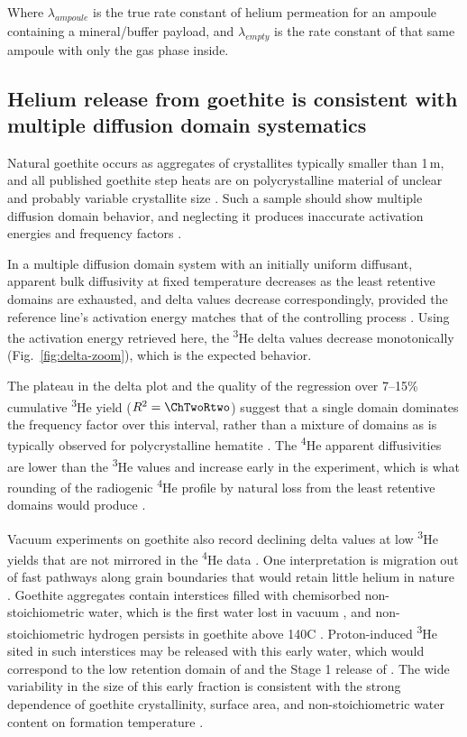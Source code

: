 Where $\lambda_{ampoule}$ is the true rate constant of helium permeation for an ampoule containing a mineral/buffer payload, and $\lambda_{empty}$ is the rate constant of that same ampoule with only the gas phase inside.

\subsection{Helium release from goethite is consistent with multiple diffusion domain systematics}\label{sec:discussion-mdd}

Natural goethite occurs as aggregates of crystallites typically smaller than 1\,\textmu m, and all published goethite step heats are on polycrystalline material of unclear and probably variable crystallite size \citep{monteiro2017,farley2024}. Such a sample should show multiple diffusion domain behavior, and neglecting it produces inaccurate activation energies and frequency factors \citep{farley2018}.

In a multiple diffusion domain system with an initially uniform diffusant, apparent bulk diffusivity at fixed temperature decreases as the least retentive domains are exhausted, and delta values decrease correspondingly, provided the reference line's activation energy matches that of the controlling process \citep{lovera1991,farley2018}. Using the activation energy retrieved here, the \textsuperscript{3}He delta values decrease monotonically (Fig.~\ref{fig:delta-zoom}), which is the expected behavior.

The plateau in the delta plot and the quality of the regression over 7--15\% cumulative \textsuperscript{3}He yield ($R^{2} = \ChTwoRtwo$) suggest that a single domain dominates the frequency factor over this interval, rather than a mixture of domains as is typically observed for polycrystalline hematite \citep{farley2018}. The \textsuperscript{4}He apparent diffusivities are lower than the \textsuperscript{3}He values and increase early in the experiment, which is what rounding of the radiogenic \textsuperscript{4}He profile by natural loss from the least retentive domains would produce \citep{shuster2004,shustervasconcelos2005}.

Vacuum experiments on goethite also record declining delta values at low \textsuperscript{3}He yields that are not mirrored in the \textsuperscript{4}He data \citep{shustervasconcelos2005,farley2024}. One interpretation is migration out of fast pathways along grain boundaries that would retain little helium in nature \citep{shustervasconcelos2005}. Goethite aggregates contain interstices filled with chemisorbed non-stoichiometric water, which is the first water lost in vacuum \citep{naono1987}, and non-stoichiometric hydrogen persists in goethite above 140\textdegree C \citep{yapppoths1995}. Proton-induced \textsuperscript{3}He sited in such interstices may be released with this early water, which would correspond to the low retention domain of \citet{shustervasconcelos2005} and the Stage 1 release of \citet{farley2024}. The wide variability in the size of this early fraction is consistent with the strong dependence of goethite crystallinity, surface area, and non-stoichiometric water content on formation temperature \citep{schwertmann1985}.

